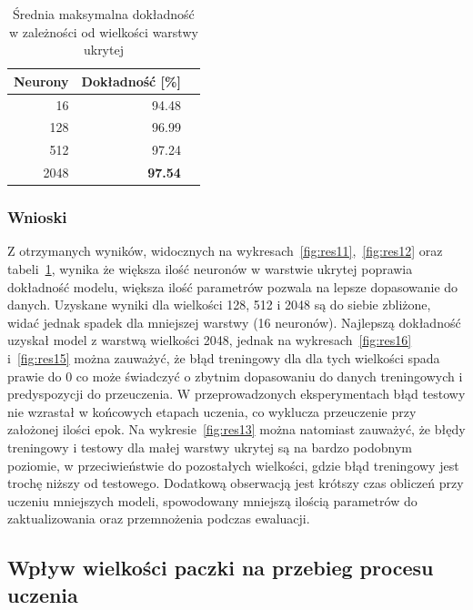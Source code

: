\documentclass{article}
\begin{document}
\begin{table}[H]
	\caption{Średnia maksymalna dokładność w zależności od wielkości warstwy ukrytej}
	\label{tabela-res-11}
	\centering
	\begin{tabular}{rrr}
		\toprule
		Neurony & Dokładność [\%] \\
		\midrule
		16      & 94.48              \\
		128     & 96.99              \\
		512     & 97.24              \\
		2048    & \textbf{97.54}     \\
		\bottomrule
	\end{tabular}
\end{table}

\subsubsection*{Wnioski}

Z otrzymanych wyników, widocznych na wykresach~\ref{fig:res11},~\ref{fig:res12} oraz tabeli~\ref{tabela-res-11}, wynika że większa ilość neuronów w warstwie ukrytej poprawia dokładność modelu, większa ilość parametrów pozwala na lepsze dopasowanie do danych. Uzyskane wyniki dla wielkości 128, 512 i 2048 są do siebie zbliżone, widać jednak spadek dla mniejszej warstwy (16 neuronów). Najlepszą dokładność uzyskał model z warstwą wielkości 2048, jednak na wykresach~\ref{fig:res16} i~\ref{fig:res15} można zauważyć, że błąd treningowy dla dla tych wielkości spada prawie do 0 co może świadczyć o zbytnim dopasowaniu do danych treningowych i predyspozycji do przeuczenia. W przeprowadzonych eksperymentach błąd testowy nie wzrastał w końcowych etapach uczenia, co wyklucza przeuczenie przy założonej ilości epok. Na wykresie~\ref{fig:res13} można natomiast zauważyć, że błędy treningowy i testowy dla małej warstwy ukrytej są na bardzo podobnym poziomie, w przeciwieństwie do pozostałych wielkości, gdzie błąd treningowy jest trochę niższy od testowego. Dodatkową obserwacją jest krótszy czas obliczeń przy uczeniu mniejszych modeli, spowodowany mniejszą ilością parametrów do zaktualizowania oraz przemnożenia podczas ewaluacji.

\newpage
\subsection{Wpływ wielkości paczki na przebieg procesu uczenia}
\end{document}
